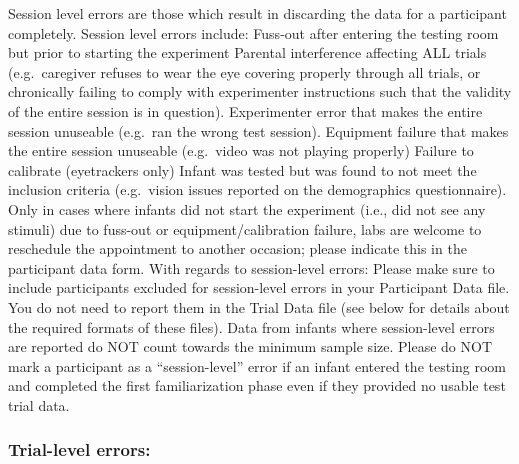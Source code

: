 \documentclass[
  letterpaper,
  DIV=11,
  numbers=noendperiod,
  oneside]{scrreprt}
\begin{document}
Session level errors are those which result in discarding the data for a
participant completely. Session level errors include: Fuss-out after
entering the testing room but prior to starting the experiment Parental
interference affecting ALL trials (e.g.~caregiver refuses to wear the
eye covering properly through all trials, or chronically failing to
comply with experimenter instructions such that the validity of the
entire session is in question). Experimenter error that makes the entire
session unuseable (e.g.~ran the wrong test session). Equipment failure
that makes the entire session unuseable (e.g.~video was not playing
properly) Failure to calibrate (eyetrackers only) Infant was tested but
was found to not meet the inclusion criteria (e.g.~vision issues
reported on the demographics questionnaire). Only in cases where infants
did not start the experiment (i.e., did not see any stimuli) due to
fuss-out or equipment/calibration failure, labs are welcome to
reschedule the appointment to another occasion; please indicate this in
the participant data form. With regards to session-level errors: Please
make sure to include participants excluded for session-level errors in
your Participant Data file. You do not need to report them in the Trial
Data file (see below for details about the required formats of these
files). Data from infants where session-level errors are reported do NOT
count towards the minimum sample size. Please do NOT mark a participant
as a ``session-level'' error if an infant entered the testing room and
completed the first familiarization phase even if they provided no
usable test trial data.

\subsubsection{Trial-level errors:}\label{trial-level-errors}
\end{document}
